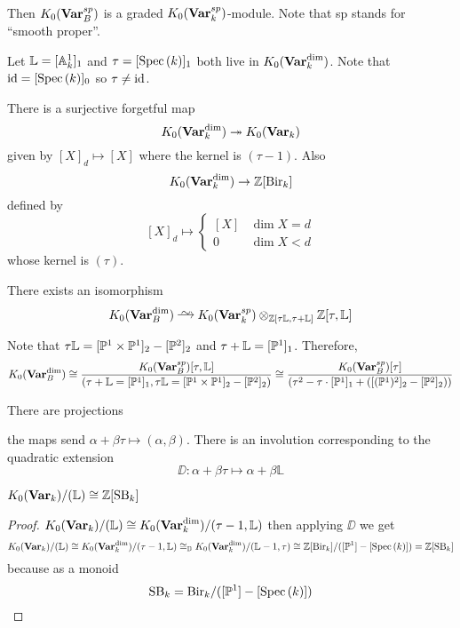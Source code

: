 \documentclass[12pt]{article}
\newcommand{\LL}{\mathbb{L}}
\begin{document}
\begin{rmk}
Then $K_0(\mathbf{Var}_B^{sp})$ is a graded $K_0(\mathbf{Var}^{sp}_k)$-module. Note that sp stands for ``smooth proper''.
\end{rmk}
\noindent
Let $\LL = [\A^1_k]_1$ and $\tau = [\mathrm{Spec}\left( k \right)]_1$ both live in $K_0(\mathbf{Var}_k^{\dim})$. Note that $\mathrm{id} = [\mathrm{Spec}\left( k \right)]_0$ so $\tau \neq \mathrm{id}$. 

\begin{rmk}
There is a surjective forgetful map
\[ K_0(\mathbf{Var}^{\dim}_k) \twoheadrightarrow K_0(\mathbf{Var}_k) \]
given by $[X]_d \mapsto [X]$ where the kernel is $(\tau - 1)$. Also
\[ K_0(\mathbf{Var}_k^{\dim}) \to \mathbb{Z}[\mathrm{Bir}_k] \]
defined by
\[ [X]_d \mapsto \begin{cases}
[X] & \dim{X} = d
\\
0 & \dim{X} < d
\end{cases} \]
whose kernel is $(\tau)$. 
\end{rmk}

\begin{theorem}
There exists an isomorphism
\[ K_0(\Var_B^{\dim}) \iso K_0(\Var_k^{sp}) \ot_{\Z[\tau \LL, \tau + \LL]} \Z[\tau, \LL] \]
\end{theorem}

\begin{rmk}
Note that $\tau \LL = [\PP^1 \times \PP^1]_2 - [\PP^2]_2$ and $\tau + \LL = [\P^1]_1$. Therefore,
\[ K_0(\Var_B^{\dim}) \cong \frac{K_0(\Var_B^{sp})[\tau, \LL]}{(\tau + \LL = [\P^1]_1, \tau \LL = [\P^1 \times \P^1]_2 - [\P^2]_2)} \cong \frac{K_0(\Var_B^{sp})[\tau]}{(\tau^2 - \tau \cdot [\P^1]_1 + ([(\P^1)^2]_2 - [\P^2]_2))} \]
\end{rmk}

There are projections
\begin{center}
\end{center}
the maps send $\alpha + \beta \tau \mapsto (\alpha, \beta)$. There is an involution corresponding to the quadratic extension
\[ \DD : \alpha + \beta \tau \mapsto \alpha + \beta \LL \]

\begin{theorem}
$K_0(\Var_k) / (\LL) \cong \ZZ[\SB_k]$
\end{theorem}

\begin{proof}
$K_0(\Var_k)/(\LL) \cong K_0(\Var_k^{\dim}) / (\tau - 1, \LL)$ then applying $\DD$ we get
\[ K_0(\Var_k)/(\LL) \cong K_0(\Var_k^{\dim}) / (\tau - 1, \LL) \cong_{\DD} K_0(\Var_k^{\dim}) / (\LL - 1, \tau) \cong \ZZ[\Bir_k]/([\PP^1] - [\Spec{k}]) = \ZZ[\SB_k] \]
because as a monoid
\[ \mathrm{SB}_k = \mathrm{Bir}_k / ([\mathbb{P}^1] - [\mathrm{Spec}\left( k \right)]) \]
\end{proof}
\end{document}
